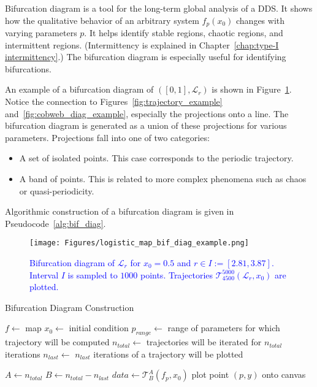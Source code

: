 \begin{remark}
\label{def: bif_diag} 
    Bifurcation diagram is a tool for the long-term global analysis of a DDS.
    It shows how the qualitative behavior of an arbitrary system $f_{p}(x_0)$ changes with varying parameters $p$.
    It helps identify stable regions, chaotic regions, and intermittent regions. (Intermittency is explained in Chapter~\ref{chap:type-I intermittency}.)
    The bifurcation diagram is especially useful for identifying bifurcations.
    \par
    An example of a bifurcation diagram of $\left( [0,1], \mathcal{L}_{r} \right)$ is shown in Figure~\ref{fig:bif_diag_example}.
    Notice the connection to Figures~\ref{fig:trajectory_example} and~\ref{fig:cobweb_diag_example}, especially the projections onto a line.
    The bifurcation diagram is generated as a union of these projections for various parameters.
    Projections fall into one of two categories:
    \begin{itemize}
        \item{A set of isolated points. This case corresponds to the periodic trajectory.}
        \item{A band of points. This is related to more complex phenomena such as chaos or quasi-periodicity.}
    \end{itemize}
    \par
    Algorithmic construction of a bifurcation diagram is given in Pseudocode~\ref{alg:bif_diag}.
\end{remark}

\begin{figure}[!h]
    \centering
    \texttt{[image: Figures/logistic\_map\_bif\_diag\_example.png]}
    \caption{
        \textcolor{blue}{
        Bifurcation diagram of $\mathcal{L}_{r}$ for $x_0 = 0.5$ and $r \in I := [ 2.81, 3.87 ]$. 
        Interval $I$ is sampled to $1000$ points. 
        Trajectories $\mathcal{T}_{4500}^{5000}(\mathcal{L}_{r}, x_0)$ are plotted.
        }
    }
    \label{fig:bif_diag_example}
\end{figure}

\begin{algorithm}
\caption{Bifurcation Diagram Construction}\label{alg:bif_diag}
\begin{algorithmic}[1]
\Statex $f \gets$ map
\Statex $x_0 \gets$ initial condition
\Statex $p_{range} \gets$ range of parameters for which trajectory will be computed
\Statex $n_{total} \gets$ trajectories will be iterated for $n_{total}$ iterations
\Statex $n_{last} \gets$ $n_{last}$ iterations of a trajectory will be plotted

    \State $A \gets n_{total}$
    \State $B \gets n_{total} - n_{last}$
    \State $data \gets \mathcal{T}_{B}^{A}(f_p, x_0)$
        \State plot point $(p, y)$ onto canvas
    \EndFor
\EndFor

\end{algorithmic}
\end{algorithm}

